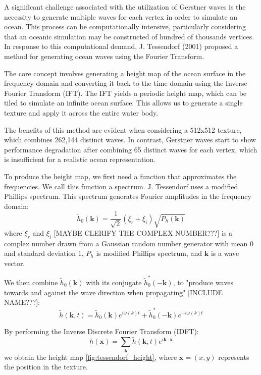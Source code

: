 \vspace{0.3cm}
A significant challenge associated with the utilization of Gerstner waves is the necessity to generate multiple waves for each vertex in order to simulate an ocean. This process can be computationally intensive, particularly considering that an oceanic simulation may be constructed of hundred of thousands vertices. In response to this computational demand, J. Tessendorf (2001) \cite{tessendorf2001} proposed a method for generating ocean waves using the Fourier Transform.

The core concept involves generating a height map of the ocean surface in the frequency domain and converting it back to the time domain using the Inverse Fourier Transform (IFT). The IFT yields a periodic height map, which can be tiled to simulate an infinite ocean surface. This allows us to generate a single texture and apply it across the entire water body.

The benefits of this method are evident when considering a 512x512 texture, which combines 262,144 distinct waves. In contrast, Gerstner waves start to show performance degradation after combining 65 distinct waves for each vertex, which is insufficient for a realistic ocean representation.

To produce the height map, we first need a function that approximates the frequencies. We call this function a spectrum. J. Tessendorf uses a modified Phillips spectrum. This spectrum generates Fourier amplitudes in the frequency domain:
\begin{equation}
    \tilde{h}_0(\mathbf{k}) = \frac{1}{\sqrt{2}}(\xi_r + \xi_i)\sqrt{P_h(\mathbf{k})}
    \label{eq:fouier_amplitudes}
\end{equation}
where $\xi_r$ and $\xi_i$ [MAYBE CLERIFY THE COMPLEX NUMBER???] is a complex number drawn from a Gaussian random number generator with mean 0 and standard deviation 1, $P_h$ is modified Phillips spectrum, and $\mathbf{k}$ is a wave vector.

We then combine $\tilde{h}_0(\mathbf{k})$ with its conjugate $\tilde{h}^{*}_0(-\mathbf{k})$, to "produce waves towards and against the wave direction when propagating"\cite{horvath2015} [INCLUDE NAME???]:
\begin{equation}
    \tilde{h}(\mathbf{k}, t) = \tilde{h}_0(\mathbf{k})e^{i\omega(k)t}+\tilde{h}^{*}_0(-\mathbf{k})e^{-i\omega(k)t}
    \label{eq:combined_amplitudes}
\end{equation}

By performing the Inverse Discrete Fourier Transform (IDFT):
\begin{equation}
    h(\mathbf{x}) = \sum_{\mathbf{k}} \tilde{h}(\mathbf{k}, t)e^{i\mathbf{k}\cdot\mathbf{x}}
    \label{eq:height_map}
\end{equation}
we obtain the height map \ref{fig:tessendorf_height}, where $\mathbf{x}=(x,y)$ represents the position in the texture.

